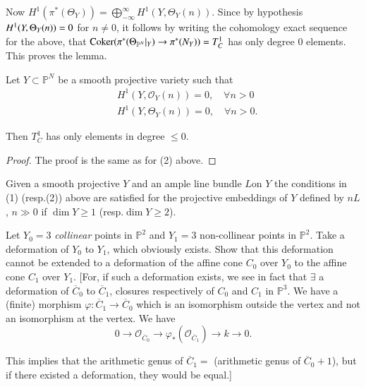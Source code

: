 {Now
$H^{1}(\pi^{\ast}(\Theta_{Y}))=\bigoplus\limits^{\infty}_{-\infty}H^{1}(Y,\Theta_{Y}(n))$. Since
by hypothesis $H^{1}(Y,\break\Theta_{Y}(n))=0$ for $n\neq 0$, it follows by
writing the cohomology exact sequence for the above, that
$\operatorname{Coker}(\pi^{\ast}(\Theta_{\mathbb{P}^{N}}|_{Y})\to
\pi^{\ast}(N_{Y}))=T^{1}_{C}$ has only degree $0$ elements. This
proves the lemma.


\begin{lemma}\label{part1-lem12.2}
Let $Y\subset \mathbb{P}^{N}$ be a smooth projective variety such that
\begin{align*}
& H^{1}(Y,\mathscr{O}_{Y}(n))=0,\quad \forall n>0\\
& H^{1}(Y,\Theta_{Y}(n))=0,\quad \forall n>0.
\end{align*}

Then $T^{1}_{C}$ has only elements in degree $\leq 0$.
\end{lemma}

\begin{proof}
The proof is the same as for (2) above.
\end{proof}

\begin{remark}\label{part1-rem12.1}
Given a smooth projective $Y$ and an ample line bundle
$L$\pageoriginale on $Y$ the conditions in (1) (resp.\@ (2)) above are
satisfied for the projective embeddings of $Y$ defined by $nL$, $n\gg
0$ if $\dim Y\geq 1$ (resp.\@ $\dim Y\geq 2$).
\end{remark}

\begin{exercise}\label{part1-exer12.1}
Let $Y_{0}=3$ {\em collinear} points in $\mathbb{P}^{2}$ and $Y_{1}=3$
non-collinear points in $\mathbb{P}^{2}$. Take a deformation of
$Y_{0}$ to $Y_{1}$, which obviously exists. Show that this deformation
cannot be extended to a deformation of the affine cone $C_{0}$ over
$Y_{0}$ to the affine cone $C_{1}$ over $Y_{1}$. [For, if such a
  deformation exists, we see in fact that $\exists$ a deformation of
  $\overline{C}_{0}$ to $\overline{C}_{1}$, closures respectively of
  $C_{0}$ and $C_{1}$ in $\mathbb{P}^{3}$. We have a (finite) morphism
  $\varphi:\overline{C}_{1}\to \overline{C}_{0}$ which is an
  isomorphism outside the vertex and not an isomorphism at the
  vertex. We have
$$
0\to \mathscr{O}_{\overline{C}_{0}}\to
\varphi_{\ast}(\mathscr{O}_{\overline{C}_{1}})\to k\to 0.
$$

This implies that the arithmetic genus of $\overline{C}_{1}=$
(arithmetic genus of $\overline{C}_{0}+1$), but if there existed a
deformation, they would be equal.]
\end{exercise}

}
